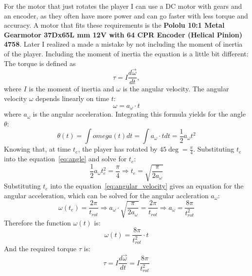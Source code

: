 For the motor that just rotates the player I can use a DC motor with gears and an encoder, as they often have more power and can go faster with less torque and accuracy.
A motor that fits these requirements is the \textbf{Pololu 10:1 Metal Gearmotor 37Dx65L mm 12V with 64 CPR Encoder (Helical Pinion) 4758}\autocite{pololu-dc}.
Later I realized a made a mistake by not including the moment of inertia of the player.
Including the moment of inertia the equation is a little bit different:
The torque is defined as
\begin{equation}
    \label{eq:torque2}
    \tau = I \frac{d\vec{\omega}}{dt},
\end{equation}
where $I$ is the moment of inertia and $\omega$ is the angular velocity.
The angular velocity $\omega$ depends linearly on time $t$:
\begin{equation}
    \label{eq:angular_velocity}
    \omega = a_\omega \cdot t
\end{equation}
where $a_\omega$ is the angular acceleration.
Integrating this formula yields for the angle $\theta$:
\begin{equation}
    \label{eq:angle}
    \theta(t) = \int omega(t)dt = \int a_\omega \cdot t dt = \frac{1}{2} a_\omega t^2
\end{equation}
Knowing that, at time $t_e$, the player has rotated by $45\deg = \frac{\pi}{4}$.
Substituting $t_e$ into the equation~\ref{eq:angle} and solve for $t_e$:
\begin{equation}
    \label{eq:time_to_rotate}
    \frac{1}{2} a_\omega t_e^2 = \frac{\pi}{4} \Rightarrow t_e = \sqrt{\frac{\pi}{2a_\omega}}
\end{equation}
Substituting $t_e$ into the equation~\ref{eq:angular_velocity} gives an equation for the angular acceleration, which can be solved for the angular accleration $a_\omega$:
\begin{equation}
    \label{eq:angular_acceleration}
    \omega(t_e) = \frac{2\pi}{t_{rot}} \Rightarrow a_{\omega} \cdot \sqrt {\frac{\pi}{2a_{\omega}}} = \frac{2\pi}{t_{rot}} \Rightarrow a_{\omega} = \frac{8\pi}{t_{rot}^2}
\end{equation}
Therefore the function $\omega(t)$ is:
\begin{equation}
    \label{eq:angular_velocity_function}
    \omega(t) = \frac{8\pi}{t_{rot}^2} \cdot t
\end{equation}
And the required torque $\tau$ is:
\begin{equation}
    \label{eq:torque3}
    \tau = I \frac{d\vec{\omega}}{dt} = I \frac{8\pi}{t_{rot}^2}
\end{equation}
